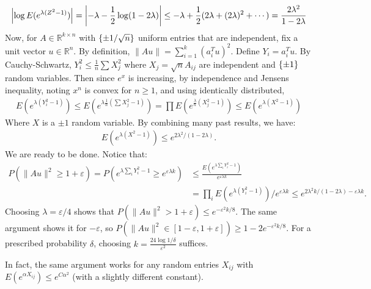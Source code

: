 \documentclass[12pt]{article}
\def\mbb#1{\mathbb{#1}}
\def \R{\mbb{R}}
\def \ve{\varepsilon}
\newcommand{\mg}[1]{\| #1 \|}
\newcommand{\SET}[1]{\Set{\mskip-\medmuskip #1 \mskip-\medmuskip}}
\begin{document}
\begin{enumerate}[label=(\alph*)]
\begin{align*}
            \qty|\log E(e^{\lambda(Z^2-1)})| = \qty|-\lambda - \frac 12 \log(1-2\lambda)| \leq -\lambda + \frac 12 (2\lambda + (2\lambda)^2 + \cdots) = \frac{2\lambda^2}{1-2\lambda}
        \end{align*}
        Now, for $A \in \R^{k \times n}$ with $\SET{\pm 1/\sqrt n}$ uniform entries that are independent, fix a unit vector $u \in \R^n$. By definition, $\mg{Au} = \sum_{i=1}^k (a_i^Tu)^2$. Define $Y_i = a_i^Tu$. By Cauchy-Schwartz, $Y_i^2 \leq \frac 1n \sum X_j^2$ where $X_j = \sqrt{n}A_{ij}$ are independent and $\SET{\pm 1}$ random variables. Then since $e^x$ is increasing, by independence and Jensens inequality, noting $x^n$ is convex for $n \geq 1$, and using identically distributed, 
        \begin{align*}
            E(e^{\lambda (Y_i^2 - 1)}) \leq E(e^{\lambda \frac 1n (\sum X_j^2 - 1)}) = \prod E(e^{\frac \lambda n (X_j^2 - 1)}) \leq E(e^{\lambda (X^2 - 1)})
        \end{align*}
        Where $X$ is a $\pm 1$ random variable. By combining many past results, we have:
        \begin{align*}
            E(e^{\lambda (X^2 - 1)}) \leq e^{2\lambda^2/(1-2\lambda)}.
        \end{align*}
        We are ready to be done. Notice that:
        \begin{align*}
            P(\mg{Au}^2 \geq 1 + \ve) = P(e^{\lambda \sum_i Y_i^2 - 1} \geq e^{\ve \lambda k}) &\leq \frac{E(e^{\lambda \sum_i Y_i^2 - 1})}{e^{\ve \lambda k}} 
            \\&= \prod_i E(e^{\lambda (Y_i^2 - 1)})/e^{\ve \lambda k} \leq e^{2\lambda^2k/(1-2\lambda) - \ve \lambda k}.
        \end{align*}
        Choosing $\lambda = \ve/4$ shows that $P(\mg{Au}^2 > 1+\ve) \leq e^{-\ve^2k/8}$. The same argument shows it for $-\ve$, so $P(\mg{Au}^2 \in [1-\ve, 1+\ve]) \geq 1-2e^{-\ve^2k/8}$. For a prescribed probability $\delta$, choosing $k = \frac{24 \log 1/\delta}{\ve^2}$ suffices. 

        In fact, the same argument works for any random entries $X_{ij}$ with $E(e^{\alpha X_{ij}}) \leq e^{C\alpha^2}$ (with a slightly different constant).
    \end{enumerate}
\end{document}

